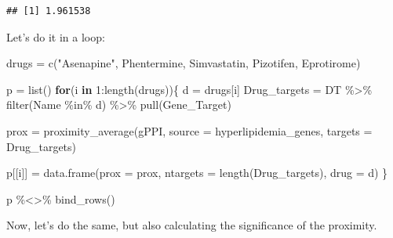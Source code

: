 \documentclass[
]{book}
\newenvironment{Shaded}{\begin{snugshade}}{\end{snugshade}}
\newcommand{\AttributeTok}[1]{\textcolor[rgb]{0.77,0.63,0.00}{#1}}
\newcommand{\ControlFlowTok}[1]{\textcolor[rgb]{0.13,0.29,0.53}{\textbf{#1}}}
\newcommand{\DecValTok}[1]{\textcolor[rgb]{0.00,0.00,0.81}{#1}}
\newcommand{\FunctionTok}[1]{\textcolor[rgb]{0.00,0.00,0.00}{#1}}
\newcommand{\NormalTok}[1]{#1}
\newcommand{\OtherTok}[1]{\textcolor[rgb]{0.56,0.35,0.01}{#1}}
\newcommand{\SpecialCharTok}[1]{\textcolor[rgb]{0.00,0.00,0.00}{#1}}
\newcommand{\StringTok}[1]{\textcolor[rgb]{0.31,0.60,0.02}{#1}}
\begin{document}
\begin{verbatim}
## [1] 1.961538
\end{verbatim}

Let's do it in a loop:

\begin{Shaded}
\begin{Highlighting}[]
\NormalTok{drugs }\OtherTok{=} \FunctionTok{c}\NormalTok{(}\StringTok{"Asenapine"}\NormalTok{, }
          \StringTok{\textquotesingle{}Phentermine\textquotesingle{}}\NormalTok{, }
          \StringTok{\textquotesingle{}Simvastatin\textquotesingle{}}\NormalTok{, }
          \StringTok{\textquotesingle{}Pizotifen\textquotesingle{}}\NormalTok{,}
          \StringTok{\textquotesingle{}Eprotirome\textquotesingle{}}\NormalTok{)}

\NormalTok{p }\OtherTok{=} \FunctionTok{list}\NormalTok{()}
\ControlFlowTok{for}\NormalTok{(i }\ControlFlowTok{in} \DecValTok{1}\SpecialCharTok{:}\FunctionTok{length}\NormalTok{(drugs))\{}
\NormalTok{  d }\OtherTok{=}\NormalTok{ drugs[i]}
\NormalTok{  Drug\_targets }\OtherTok{=}\NormalTok{ DT }\SpecialCharTok{\%\textgreater{}\%} 
    \FunctionTok{filter}\NormalTok{(Name }\SpecialCharTok{\%in\%}\NormalTok{ d) }\SpecialCharTok{\%\textgreater{}\%}
    \FunctionTok{pull}\NormalTok{(Gene\_Target)}
  
\NormalTok{  prox }\OtherTok{=} \FunctionTok{proximity\_average}\NormalTok{(gPPI, }
                           \AttributeTok{source =}\NormalTok{ hyperlipidemia\_genes, }
                           \AttributeTok{targets =}\NormalTok{ Drug\_targets)}
  
\NormalTok{  p[[i]] }\OtherTok{=} \FunctionTok{data.frame}\NormalTok{(}\AttributeTok{prox =}\NormalTok{ prox, }
                      \AttributeTok{ntargets =} \FunctionTok{length}\NormalTok{(Drug\_targets), }
                      \AttributeTok{drug =}\NormalTok{ d)}
\NormalTok{\}}

\NormalTok{p }\SpecialCharTok{\%\textless{}\textgreater{}\%} \FunctionTok{bind\_rows}\NormalTok{()}
\end{Highlighting}
\end{Shaded}

Now, let's do the same, but also calculating the significance of the proximity.
\end{document}
